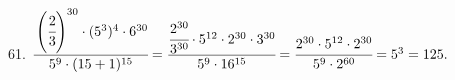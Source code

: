 61. $\cfrac{\left(\cfrac{2}{3}\right)^{30}\cdot(5^3)^4\cdot6^{30}}{5^9\cdot(15+1)^{15}}=\cfrac{\cfrac{2^{30}}{3^{30}}\cdot5^{12}\cdot2^{30}\cdot3^{30}}{5^9\cdot16^{15}}=
\cfrac{2^{30}\cdot5^{12}\cdot2^{30}}{5^9\cdot2^{60}}=5^3=125.$\\

